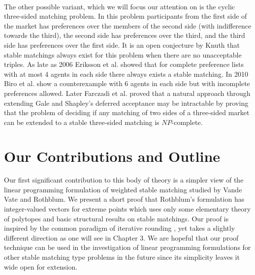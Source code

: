 \paragraph{}
The other possible variant, which we will focus our attention on is the cyclic three-sided matching problem. In this problem participants from the first side of the market has preferences over the members of the second side (with indifference towards the third), the second side has preferences over the third, and the third side has preferences over the first side. It is an open conjecture by Knuth that stable matchings always exist for this problem when there are no unacceptable triples. As late as 2006 Eriksson et al. \cite{eriksson2006three} showed that for complete preference lists with at most 4 agents in each side there always exists a stable matching. In 2010 Biro et al. \cite{biro2010three} show a counterexample with 6 agents in each side but with incomplete preferences allowed. Later Farczadi et al. \cite{farczadi2014stable} proved that a natural approach through extending Gale and Shapley's deferred acceptance may be intractable by proving that the problem of deciding if any matching of two sides of a three-sided market can be extended to a stable three-sided matching is $NP$-complete.

\section{Our Contributions and Outline}

\paragraph{}
Our first significant contribution to this body of theory is a simpler view of the linear programming formulation of weighted stable matching studied by Vande Vate and Rothblum. We present a short proof that Rothblum's formulation has integer-valued vectors for extreme points which uses only some elementary theory of polytopes and basic structural results on stable matchings. Our proof is inspired by the common paradigm of iterative rounding \cite{lau2011iterative}, yet takes a slightly different direction as one will see in Chapter $3$. We are hopeful that our proof technique can be used in the investigation of linear programming formulations for other stable matching type problems in the future since its simplicity leaves it wide open for extension.
